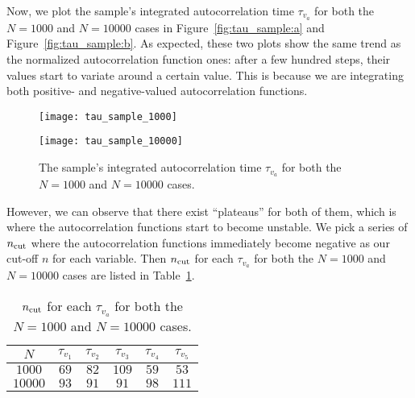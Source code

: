 Now, we plot the sample's integrated
autocorrelation time \(\tau_{v_a}\) for both the \(N = 1000\) and \(N = 10000\) cases
in Figure~\ref{fig:tau_sample:a} and Figure~\ref{fig:tau_sample:b}.
As expected, these two plots show the same trend as the normalized autocorrelation function
ones: after a few hundred steps, their values start to variate around a certain value.
This is because we are integrating both positive- and negative-valued
autocorrelation functions.

\begin{figure}
    \centering
    \begin{minipage}[t]{0.8\linewidth}
        \centering
        \texttt{[image: tau\_sample\_1000]}
        \label{fig:tau_sample:a}
    \end{minipage}
    \hfill
    \begin{minipage}[t]{0.8\linewidth}
        \centering
        \texttt{[image: tau\_sample\_10000]}
        \label{fig:tau_sample:b}
    \end{minipage}
    \caption{The sample's integrated
        autocorrelation time \(\tau_{v_a}\) for both the \(N = 1000\) and \(N = 10000\) cases.}
    \label{fig:tau_sample}
\end{figure}

However, we can observe that there exist ``plateaus'' for both of them, which is where
the autocorrelation functions start to become unstable. We pick a series of
\(n_\textnormal{cut}\) where the autocorrelation functions immediately become
negative as our cut-off \(n\) for each variable.
Then \(n_\textnormal{cut}\) for each \(\tau_{v_a}\) for both the
\(N = 1000\) and \(N = 10000\) cases are listed in Table~\ref{tab:ncut}.

\begin{table}[H]
    \centering
    \caption{\(n_\textnormal{cut}\) for each \(\tau_{v_a}\) for both the
        \(N = 1000\) and \(N = 10000\) cases.}
    \label{tab:ncut}
    \begin{tabular}{@{}cccccc@{}}
        \toprule
        \(N\)     & \(\tau_{v_1}\) & \(\tau_{v_2}\) & \(\tau_{v_3}\) & \(\tau_{v_4}\) & \(\tau_{v_5}\) \\
        \midrule
        \(1000\)  & \(69\)         & \(82\)         & \(109\)        & \(59\)         & \(53\)         \\
        \(10000\) & \(93\)         & \(91\)         & \(91\)         & \(98\)         & \(111\)        \\
        \bottomrule
    \end{tabular}
\end{table}

